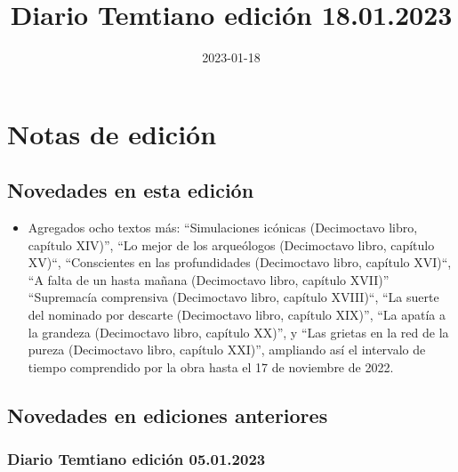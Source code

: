 \documentclass[
]{book}
\title{Diario Temtiano edición 18.01.2023}
\author{}
\date{\vspace{-2.5em}2023-01-18}
\providecommand{\tightlist}{%
  \setlength{\itemsep}{0pt}\setlength{\parskip}{0pt}}
\begin{document}
\maketitle

{
\setcounter{tocdepth}{1}
\tableofcontents
}
\hypertarget{notas-de-ediciuxf3n}{%
\chapter*{Notas de edición}\label{notas-de-ediciuxf3n}}

\hypertarget{novedades-en-esta-ediciuxf3n}{%
\section*{Novedades en esta edición}\label{novedades-en-esta-ediciuxf3n}}

\begin{itemize}
\tightlist
\item
  Agregados ocho textos más: ``Simulaciones icónicas (Decimoctavo libro, capítulo XIV)'', ``Lo mejor de los arqueólogos (Decimoctavo libro, capítulo XV)``, ``Conscientes en las profundidades (Decimoctavo libro, capítulo XVI)``, ``A falta de un hasta mañana (Decimoctavo libro, capítulo XVII)'' ``Supremacía comprensiva (Decimoctavo libro, capítulo XVIII)``, ``La suerte del nominado por descarte (Decimoctavo libro, capítulo XIX)'', ``La apatía a la grandeza (Decimoctavo libro, capítulo XX)'', y ``Las grietas en la red de la pureza (Decimoctavo libro, capítulo XXI)'', ampliando así el intervalo de tiempo comprendido por la obra hasta el 17 de noviembre de 2022.
\end{itemize}

\hypertarget{novedades-en-ediciones-anteriores}{%
\section*{Novedades en ediciones anteriores}\label{novedades-en-ediciones-anteriores}}

\hypertarget{diario-temtiano-ediciuxf3n-05.01.2023}{%
\subsection*{Diario Temtiano edición 05.01.2023}\label{diario-temtiano-ediciuxf3n-05.01.2023}}
\end{document}
